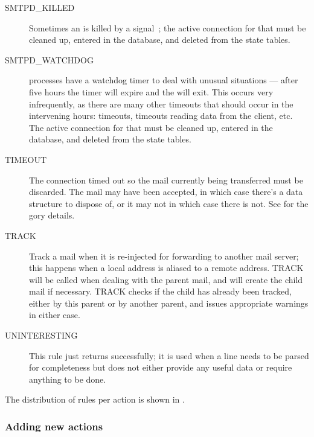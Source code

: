 \begin{description}
    \item [SMTPD\_KILLED] Sometimes an  is killed by a
        signal~\cite{Wikipedia-unix-signals}; the active connection for
        that  must be cleaned up, entered in the database,
        and deleted from the state tables.

    \item [SMTPD\_WATCHDOG]  processes have a watchdog timer
        to deal with unusual situations --- after five hours the timer will
        expire and the  will exit.  This occurs very
        infrequently, as there are many other timeouts that should occur
        in the intervening hours: \DNS{} timeouts, timeouts reading data
        from the client, etc\@.  The active connection for that
         must be cleaned up, entered in the database, and
        deleted from the state tables.

    \item [TIMEOUT] The connection timed out so the mail currently being
        transferred must be discarded. The mail may have been accepted, in
        which case there's a data structure to dispose of, or it may not in
        which case there is not.  See
         for the gory details.

    \item [TRACK] Track a mail when it is re-injected for forwarding to
        another mail server; this happens when a local address is aliased
        to a remote address.  TRACK will be called when dealing with the
        parent mail, and will create the child mail if necessary. TRACK
        checks if the child has already been tracked, either by this parent
        or by another parent, and issues appropriate warnings in either
        case.

    \item [UNINTERESTING] This rule just returns successfully; it is used when a
        line needs to be parsed for completeness but does not either
        provide any useful data or require anything to be done.

\end{description}

The distribution of rules per action is shown in .


\subsubsection{Adding new actions}

